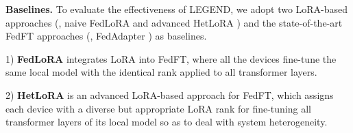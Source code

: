 



\textbf{Baselines.}
To evaluate the effectiveness of LEGEND, we adopt two LoRA-based approaches (\ie, naive FedLoRA \cite{zhang2023fedpetuning} and advanced HetLoRA \cite{cho2023heterogeneous}) and the state-of-the-art FedFT approaches (\ie, FedAdapter \cite{cai2022fedadapter}) as baselines.

1) \textbf{FedLoRA} 
integrates LoRA \cite{hu2021lora} into FedFT, where all the devices fine-tune the same local model with the identical rank applied to all transformer layers.

2) \textbf{HetLoRA}  
is an advanced LoRA-based approach for FedFT, which assigns each device with a diverse but appropriate LoRA rank for fine-tuning all transformer layers of its local model so as to deal with system heterogeneity.


